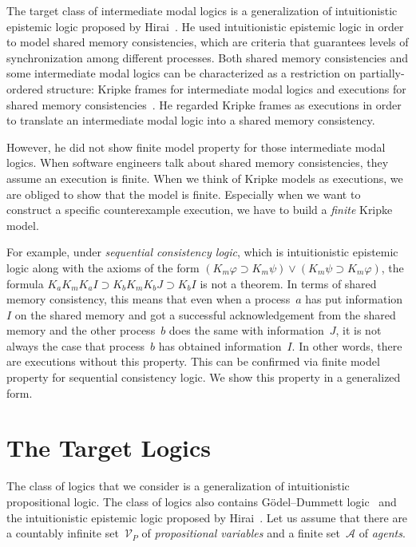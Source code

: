 \documentclass[doctor]{iscs-thesis}
\newcommand{\pvar}{\mathcal V_P}
\newcommand{\agents}{\mathcal A}
\begin{document}
The target class of intermediate modal logics is a generalization of
intuitionistic epistemic logic proposed by Hirai~\cite{hirailpar}.
He used intuitionistic epistemic logic in order to model shared memory
consistencies, which are criteria that guarantees levels of
synchronization among different processes.
Both shared memory consistencies and some intermediate modal logics
can be characterized as a restriction on
partially-ordered structure:
Kripke frames for intermediate modal logics
and executions for shared memory
consistencies~\cite{steinke2004unified}.
He regarded Kripke frames as executions in order to translate
an intermediate modal logic into a shared memory
consistency.

However, he did not show finite model property for those
intermediate modal logics.  When software engineers talk about shared
memory consistencies, they assume an execution is finite.
When we think of Kripke models as executions, we are obliged to show
that the model is finite.
Especially when we want to construct a specific counterexample execution,
we have to build a \textit{finite} Kripke model.

For example,
under \textit{sequential consistency logic}, which is intuitionistic epistemic
logic along with the axioms of the form
$(K_m\varphi\supset K_m\psi) \vee (K_m\psi\supset K_m\varphi)$,
the formula $K_aK_mK_aI \supset K_bK_mK_bJ\supset K_bI$ is not a
theorem.
In terms of shared memory consistency, this means that even when a
process~$a$ has put information~$I$ on the shared memory and got a
successful acknowledgement from the shared memory and the other
process~$b$ does the same with information~$J$, it is not always the
case that process~$b$ has obtained information~$I$\kern -2pt.
In other words, there are executions without this property.
This can be confirmed via
finite model property for sequential consistency logic.
We show this property in a generalized form.

\section{The Target Logics}
 \label{logic}

The class of logics that we consider is a generalization of
intuitionistic propositional logic.
The class of logics also contains G\"{o}del--Dummett logic~\cite{dummett59}
and the intuitionistic epistemic logic proposed by 
Hirai~\cite{hirailpar}.
Let us assume that
there are a countably infinite set~$\pvar$ of \textit{propositional variables} and a 
finite set~$\agents$ of \textit{agents}. 
\end{document}
